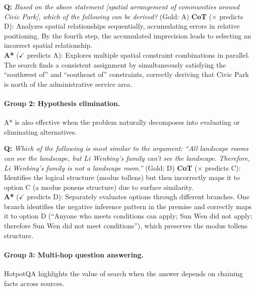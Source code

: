 \documentclass[11pt]{article}
\begin{document}
\begin{examplebox}[title=LogicQA --- Non-linear Evidence Aggregation]
\textbf{Q:} \emph{Based on the above statement [spatial arrangement of communities around Civic Park], which of the following can be derived?} \quad (Gold: A)
\tcblower
\textbf{CoT} ($\times$ predicts D): Analyzes spatial relationships sequentially, accumulating errors in relative positioning. By the fourth step, the accumulated imprecision leads to selecting an incorrect spatial relationship.\\[4pt]
\textbf{A*} ($\checkmark$ predicts A): Explores multiple spatial constraint combinations in parallel. The search finds a consistent assignment by simultaneously satisfying the ``southwest of'' and ``southeast of'' constraints, correctly deriving that Civic Park is north of the administrative service area.
\end{examplebox}

\paragraph{Group 2: Hypothesis elimination.}
A* is also effective when the problem naturally decomposes into evaluating or eliminating alternatives.

\begin{examplebox}[title=LogicQA --- Hypothesis Elimination]
\textbf{Q:} \emph{Which of the following is most similar to the argument: ``All landscape rooms can see the landscape, but Li Wenbing's family can't see the landscape. Therefore, Li Wenbing's family is not a landscape room.''} \quad (Gold: D)
\tcblower
\textbf{CoT} ($\times$ predicts C): Identifies the logical structure (modus tollens) but then incorrectly maps it to option C (a modus ponens structure) due to surface similarity.\\[4pt]
\textbf{A*} ($\checkmark$ predicts D): Separately evaluates options through different branches. One branch identifies the negative inference pattern in the premise and correctly maps it to option D (``Anyone who meets conditions can apply; Sun Wen did not apply; therefore Sun Wen did not meet conditions''), which preserves the modus tollens structure.
\end{examplebox}

\paragraph{Group 3: Multi-hop question answering.}
HotpotQA highlights the value of search when the answer depends on chaining facts across sources.
\end{document}
